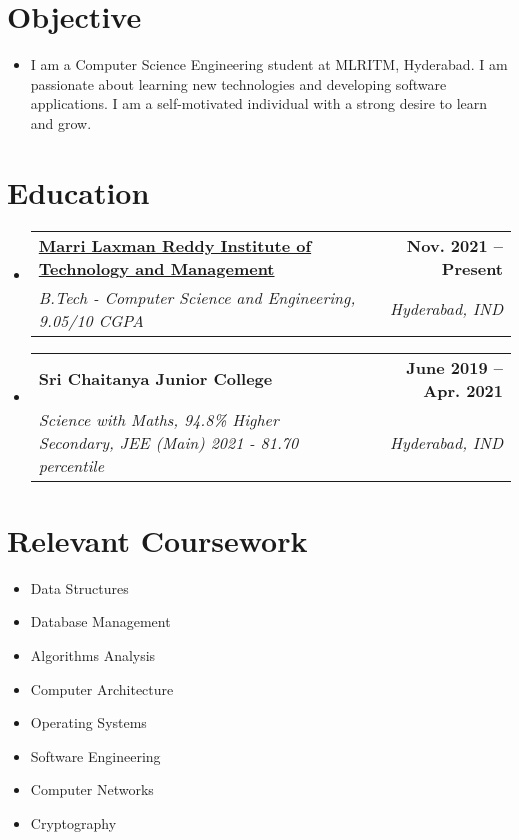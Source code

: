 \documentclass[a4paper,11pt]{article}
\makeatletter
\newcommand{\resumeSubheading}[4]{
  \vspace{-2pt}\item
    \begin{tabular*}{0.97\textwidth}[t]{l@{\extracolsep{\fill}}r}
      \textbf{#1} & \textbf{\small #2} \\
      \textit{\small#3} & \textit{\small #4} \\
    \end{tabular*}\vspace{-7pt}
}
\newcommand{\resumeSubHeadingListStart}{\begin{itemize}[leftmargin=0.15in, label={}]}
\newcommand{\resumeSubHeadingListEnd}{\end{itemize}}
\makeatother
\begin{document}
\section{Objective}
  \begin{itemize}[leftmargin=0.15in, label={}]
    \item \fontsize{10}{12} \selectfont
    I am a Computer Science Engineering student at MLRITM, Hyderabad. I am passionate about learning new technologies and developing software applications. I am a self-motivated individual with a strong desire to learn and grow.
  \end{itemize}

\vspace{-15pt}
\section{Education}
  \resumeSubHeadingListStart
    \resumeSubheading
      {\href{https://mlritm.ac.in}{Marri Laxman Reddy Institute of Technology and Management}}{Nov. 2021 -- Present}
      {B.Tech - Computer Science and Engineering, 9.05/10 CGPA}{Hyderabad, IND}
    \resumeSubheading
      {Sri Chaitanya Junior College}{June 2019 -- Apr. 2021}
      {Science with Maths, 94.8\% Higher Secondary, JEE (Main) 2021 - 81.70 percentile}{Hyderabad, IND}
  \resumeSubHeadingListEnd

\section{Relevant Coursework}
        \begin{multicols}{4}
            \begin{itemize}[itemsep=-3pt, parsep=3pt]
              \small
                \item Data Structures
                \item Database Management
                \item Algorithms Analysis
                \item Computer Architecture
                \item Operating Systems
                \item Software Engineering
                \item Computer Networks
                \item Cryptography
            \end{itemize}
        \end{multicols}
        \vspace*{2.0\multicolsep}
\end{document}
